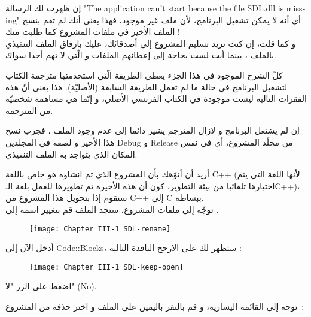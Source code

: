 \begin{information}
إن ظهرت لك الرسالة 
"\textenglish{The application can't start because the file SDL.dll is missing}"
أي أنه لا يمكن تشغيل البرنامج، لأن ملف 
غير موجود، فهذا يعني أنك لم تقم بنسخ الملف الأخير في ملفات المشروع كما طلبت منك !\\
و كما قلت، إن كنت تريد تسليم المشروع إلى أصدقائك، عليك بارفاق الملف التنفيذي 
بالملف 
،
بينما أنت لست بحاجة إلى إعطائهم الملفات 
و
الّتي لا تهم أحدا سواك.
\end{information}

\begin{tcolorbox}[breakable,title=ملاحظات مترجمة الكتاب, colback=orange!20, colframe=orange!70, fontupper=\footnotesize, coltitle=white, fonttitle=\normalsize, attach title]
كلّ الشرح الموجود في هذا الجزء يعطي الطريقة الّتي استخدمتها مترجمة الكتاب لتشغيل البرنامج في حالة ما لم تعمل الطريقة السابقة (الأصليّة). هذا يعني أنّ هذه الفقرات التالية ليست موجودة في الكتاب الفرنسي الأصلي، و إنّما هي مساهمة شخصيّة من المترجمة.
\tcblower

إن لم يشتغل البرنامج و لازال المترجم يشير دائما إلى عدم وجود الملف 
،
فجرب نسخ هذا الأخير و لصقه في المجلدين 
\textenglish{Debug}
و 
\textenglish{Release}
من مجلّد المشروع، أي في نفس المكان الذي يتواجد به الملف التنفيذي.

أريد أن أنوّهك بأن المشروع الذي تم انشاؤه هو خاص باللغة 
\textenglish{C++}
(لأنها اللغة التي يتم اختيارها تلقائيا من بيئة التطوير، كون أن هذه الأخيرة تم تطويرها للعمل بلغة الـ\textenglish{C++})،
سنقوم إذا بتحويل هذا المشروع من
\textenglish{C++}
إلى 
\textenglish{C}
ببساطة.\\
توجّه إلى ملفات المشروع، ستجد الملف
قم بتغيير اسمه إلى
.

 \begin{figure}[H]
	\centering
	\texttt{[image: Chapter\_III-1\_SDL-rename]}
\end{figure}

أدخل الآن إلى
\textenglish{Code::Blocks}،
ستظهر لك على الأرجح النافذة التالية :

 \begin{figure}[H]
	\centering
	\texttt{[image: Chapter\_III-1\_SDL-keep-open]}
\end{figure}


اضغط على الزر "لا"
(\textenglish{No}).

توجه إلى القائمة اليسارية، و قم بالنقر باليمين على الملف
و اختر حذفه من المشروع~:


\end{tcolorbox}
